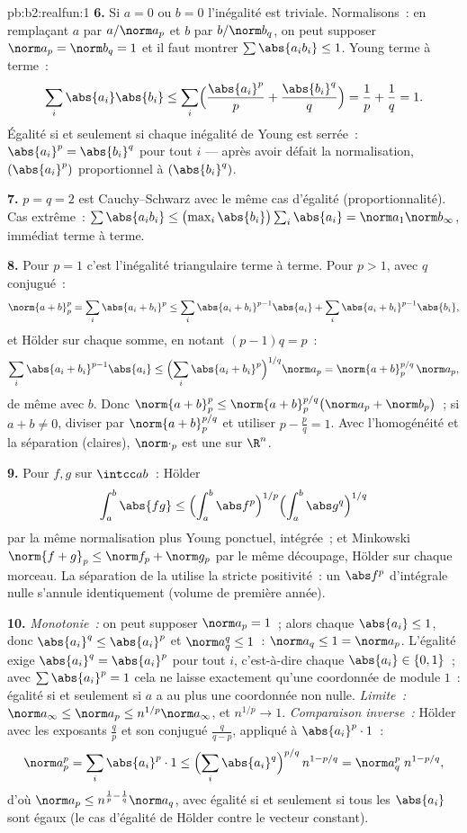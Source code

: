 \begin{solution}{pb:b2:realfun:1}
\textbf{6.} Si $a = 0$ ou $b = 0$ l'inégalité est triviale.
Normalisons~: en remplaçant $a$ par $a/\norm a_p$ et $b$ par $b/\norm
b_q$, on peut supposer $\norm a_p = \norm b_q = 1$ et il faut montrer
$\sum\abs{a_ib_i} \leq 1$. Young terme à terme~:
\[
\sum_i\abs{a_i}\abs{b_i} \leq
\sum_i\Bigl(\frac{\abs{a_i}^p}{p} +
\frac{\abs{b_i}^q}{q}\Bigr) = \frac1p + \frac1q = 1 .
\]
Égalité si et seulement si chaque inégalité de Young est serrée~:
$\abs{a_i}^p = \abs{b_i}^q$ pour tout $i$ --- après avoir défait la
normalisation, $(\abs{a_i}^p)$ proportionnel à $(\abs{b_i}^q)$.

\textbf{7.} $p = q = 2$ est Cauchy--Schwarz avec le même cas
d'égalité (proportionnalité). Cas extrême~: $\sum\abs{a_ib_i}
\leq \bigl(\max_i\abs{b_i}\bigr)\sum_i\abs{a_i} =
\norm a_1\norm b_\infty$, immédiat terme à terme.

\textbf{8.} Pour $p = 1$ c'est l'inégalité triangulaire terme à
terme. Pour $p > 1$, avec $q$ conjugué~:
\[
\norm{a+b}_p^p = \sum_i\abs{a_i + b_i}^p
\leq \sum_i\abs{a_i+b_i}^{p-1}\abs{a_i} +
\sum_i\abs{a_i+b_i}^{p-1}\abs{b_i},
\]
et Hölder sur chaque somme, en notant $(p - 1)q = p$~:
\[
\sum_i\abs{a_i+b_i}^{p-1}\abs{a_i} \leq
\Bigl(\sum_i\abs{a_i+b_i}^{p}\Bigr)^{1/q}\norm a_p
= \norm{a + b}_p^{p/q}\,\norm a_p ,
\]
de même avec $b$. Donc $\norm{a+b}_p^p \leq \norm{a +
b}_p^{p/q}\bigl(\norm a_p + \norm b_p\bigr)$~; si $a + b \neq 0$,
diviser par $\norm{a+b}_p^{p/q}$ et utiliser $p - \frac pq = 1$. Avec
l'homogénéité et la séparation (claires), $\norm\cdot_p$ est une
 sur $\R^n$.

\textbf{9.} Pour $f, g$  sur $\intcc ab$~: Hölder
\[
\int_a^b\abs{fg} \leq \Bigl(\int_a^b\abs
f^p\Bigr)^{1/p}\Bigl(\int_a^b\abs g^q\Bigr)^{1/q}
\]
par la même normalisation plus Young ponctuel, intégrée~; et
Minkowski $\norm{f + g}_p \leq \norm f_p + \norm g_p$ par le même
découpage, Hölder sur chaque morceau. La séparation de la 
utilise la stricte positivité~: un $\abs f^p$  d'intégrale
nulle s'annule identiquement (volume de première année).

\textbf{10.} \emph{Monotonie~:} on peut supposer $\norm a_p = 1$~;
alors chaque $\abs{a_i} \leq 1$, donc $\abs{a_i}^q \leq \abs{a_i}^p$
et $\norm a_q^q \leq 1$~: $\norm a_q \leq 1 = \norm a_p$.
L'égalité exige $\abs{a_i}^q = \abs{a_i}^p$ pour tout $i$,
c'est-à-dire chaque $\abs{a_i} \in \{0, 1\}$~; avec
$\sum\abs{a_i}^p = 1$ cela ne laisse exactement qu'une coordonnée de
module $1$~: égalité si et seulement si $a$ a au plus une coordonnée
non nulle. \emph{Limite~:} $\norm a_\infty \leq
\norm a_p \leq n^{1/p}\norm a_\infty$, et $n^{1/p} \to 1$.
\emph{Comparaison inverse~:} Hölder avec les exposants $\frac
qp$ et son conjugué $\frac{q}{q-p}$, appliqué à
$\abs{a_i}^p\cdot 1$~:
\[
\norm a_p^p = \sum_i\abs{a_i}^p\cdot 1 \leq
\Bigl(\sum_i\abs{a_i}^{q}\Bigr)^{p/q}\,n^{1 - p/q}
= \norm a_q^{p}\; n^{1-p/q},
\]
d'où $\norm a_p \leq n^{\frac1p - \frac1q}\norm a_q$, avec
égalité si et seulement si tous les $\abs{a_i}$ sont égaux (le cas
d'égalité de Hölder contre le vecteur constant).


\end{solution}
